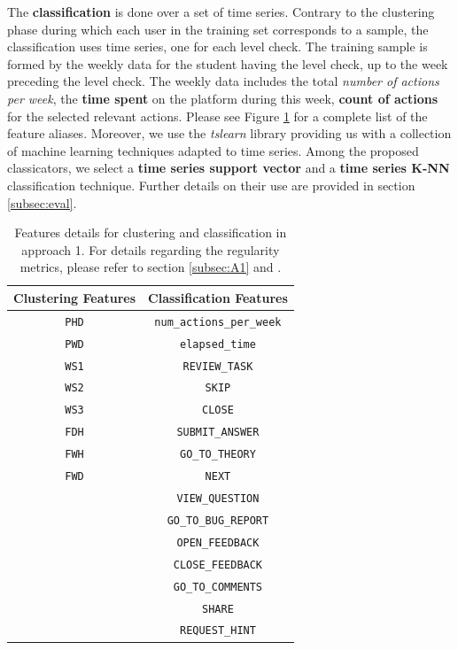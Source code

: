 \documentclass[sigplan,screen]{acmart}
\begin{document}
The \textbf{classification} is done over a set of time series. Contrary to the clustering phase during which each user in the training set corresponds to a sample, the classification uses time series, one for each level check. The training sample is formed by the weekly data for the student having the level check, up to the week preceding the level check. The weekly data includes the total \textit{number of actions per week}, the \textbf{time spent} on the platform during this week, \textbf{count of actions} for the selected relevant actions. Please see Figure \ref{tab:A1_feature_vectors} for a complete list of the feature aliases. Moreover, we use the \emph{tslearn} \cite{tslearn} library providing us with a collection of machine learning techniques adapted to time series. Among the proposed classicators, we select a \textbf{time series support vector} and a \textbf{time series K-NN} classification technique. Further details on their use are provided in section \ref{subsec:eval}.

\begin{table}[h]
    \centering
    \caption{Features details for clustering and classification in approach 1. For details regarding the regularity metrics, please refer to section \ref{subsec:A1} and \cite{quantifyreg}.}
    \begin{tabular}{|c|c|}
    \hline
        Clustering Features & Classification Features \\ \hline
        \texttt{PHD} & \texttt{num\_actions\_per\_week} \\ 
        \texttt{PWD} & \texttt{elapsed\_time} \\
        \texttt{WS1} & \texttt{REVIEW\_TASK} \\ 
        \texttt{WS2} &\texttt{SKIP} \\ 
        \texttt{WS3} &\texttt{CLOSE} \\ 
        \texttt{FDH} &\texttt{SUBMIT\_ANSWER} \\ 
        \texttt{FWH} &\texttt{GO\_TO\_THEORY} \\ 
        \texttt{FWD} &\texttt{NEXT} \\ 
        &\texttt{VIEW\_QUESTION} \\ 
        &\texttt{GO\_TO\_BUG\_REPORT} \\ 
        &\texttt{OPEN\_FEEDBACK} \\ 
        &\texttt{CLOSE\_FEEDBACK} \\ 
        &\texttt{GO\_TO\_COMMENTS} \\ 
        &\texttt{SHARE} \\ 
        &\texttt{REQUEST\_HINT} \\ \hline
    \end{tabular}
    \label{tab:A1_feature_vectors}
\end{table}
\end{document}
